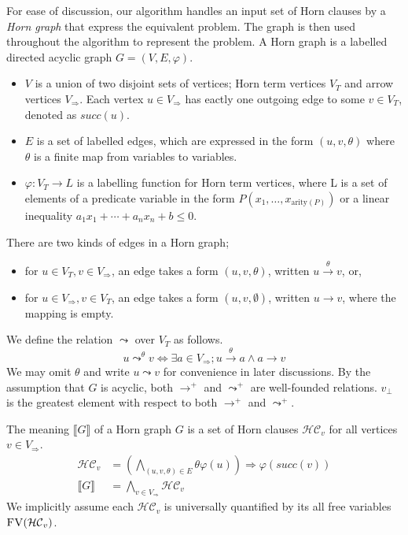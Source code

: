 \documentclass[a4paper,12pt]{article}
\newcommand{\edge}[2]{#1\rightarrow#2}
\newcommand{\edgel}[3]{#1\xrightarrow{#2}#3}
\begin{document}
For ease of discussion, our algorithm handles an input set of Horn
clauses by a \emph{Horn graph} that express the equivalent problem.
The graph is then used throughout the algorithm to represent the
problem.  A Horn graph is a labelled directed acyclic graph
$G=(V,E,\varphi)$.
\begin{itemize}
\item $V$ is a union of two disjoint sets of vertices; Horn term
  vertices $V_T$ and arrow vertices $V_\Rightarrow$.  Each vertex $u
  \in V_\Rightarrow$ has eactly one outgoing edge to some $v \in V_T$,
  denoted as $succ(u)$.
\item $E$ is a set of labelled edges, which are expressed in the form
  $(u,v,\theta)$ where $\theta$ is a finite map from variables to
  variables.
\item $\varphi: V_T \rightarrow L$ is a labelling function for Horn
  term vertices, where L is a set of elements of a predicate variable
  in the form $P(x_1, \ldots, x_{\mathrm{arity}(P)})$ or a linear
  inequality $a_1 x_1 + \cdots + a_n x_n + b \leq 0$.
\end{itemize}
There are two kinds of edges in a Horn graph;
\begin{itemize}
\item for $u \in V_T, v \in V_\Rightarrow$, an edge takes a form
  $(u,v,\theta)$, written $\edgel{u}{\theta}{v}$, or,
\item for $u \in V_\Rightarrow, v \in V_T$, an edge takes a form
  $(u,v,\emptyset)$, written $\edge{u}{v}$, where the mapping is
  empty.
\end{itemize}

We define the relation $\leadsto$ over $V_T$ as follows.
\[ u \mathop{\leadsto}^\theta v \Longleftrightarrow \exists a \in V_\Rightarrow;
\edgel{u}{\theta}{a} \wedge \edge{a}{v} \] We may omit $\theta$ and
write $u \leadsto v$ for convenience in later discussions. By the
assumption that $G$ is acyclic, both $\rightarrow^+$ and $\leadsto^+$ are
well-founded relations. $v_\bot$ is the greatest element with respect
to both $\rightarrow^+$ and $\leadsto^+$.

The meaning $\llbracket G \rrbracket $ of a Horn graph $G$ is a set of
Horn clauses $\mathcal{HC}_v$ for all vertices $v \in V_\Rightarrow$.
\begin{align*}
\mathcal{HC}_v & = \left( \bigwedge_{(u,v,\theta) \in E} \theta \varphi(u) \right) \Longrightarrow \varphi(succ(v)) \\
\llbracket G \rrbracket & = \bigwedge_{v \in V_\Rightarrow} \mathcal{HC}_v
\end{align*}
We implicitly assume each $\mathcal{HC}_v$ is universally quantified
by its all free variables $\textsc{FV}(\mathcal{HC}_v)$.
\end{document}
